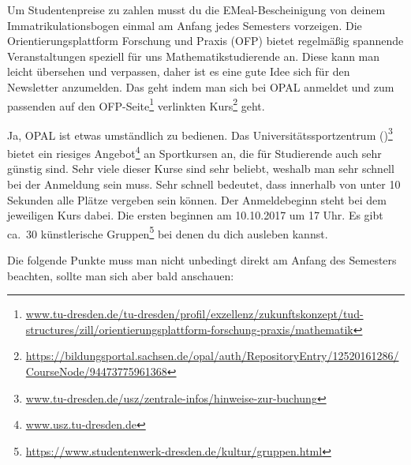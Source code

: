 \documentclass{scrartcl}
\begin{document}
\begin{description}
    Um Studentenpreise zu zahlen musst du die EMeal-Bescheinigung von deinem Immatrikulationsbogen
    einmal am Anfang jedes Semesters vorzeigen.
   Die Orientierungsplattform Forschung und Praxis (OFP) bietet regelmäßig spannende Veranstaltungen
    speziell für uns Mathematikstudierende an.
    Diese kann man leicht übersehen und verpassen,
    daher ist es eine gute Idee sich für den Newsletter anzumelden.
    Das geht indem man sich bei OPAL anmeldet und zum passenden auf den
    OFP-Seite\footnote{\url{www.tu-dresden.de/tu-dresden/profil/exzellenz/zukunftskonzept/tud-structures/zill/orientierungsplattform-forschung-praxis/mathematik}}
    verlinkten Kurs\footnote{\url{https://bildungsportal.sachsen.de/opal/auth/RepositoryEntry/12520161286/CourseNode/94473775961368}} geht.
    
    Ja, OPAL ist etwas umständlich zu bedienen.
   Das Universitätssportzentrum ()\footnote{\url{www.tu-dresden.de/usz/zentrale-infos/hinweise-zur-buchung}} bietet ein riesiges Angebot\footnote{\url{www.usz.tu-dresden.de}} an
    Sportkursen an, die für Studierende auch sehr günstig sind.
    Sehr viele dieser Kurse sind sehr beliebt, weshalb man sehr schnell bei der Anmeldung sein muss.
    Sehr schnell bedeutet, dass innerhalb von unter 10 Sekunden alle Plätze vergeben sein können.
    Der Anmeldebeginn steht bei dem jeweiligen Kurs dabei. Die ersten beginnen am 10.10.2017 um 17 Uhr.
   Es gibt ca.\ 30 künstlerische Gruppen\footnote{\url{https://www.studentenwerk-dresden.de/kultur/gruppen.html}} bei denen du dich ausleben kannst.
\end{description}
Die folgende Punkte muss man nicht unbedingt direkt am Anfang des Semesters beachten, sollte man
sich aber bald anschauen:
\end{document}
